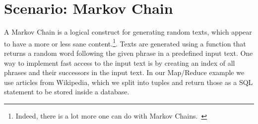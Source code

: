 \section{Scenario: Markov Chain} 

A Markov Chain is a logical construct for generating random texts, which appear to have a more or less sane content.\footnote{Indeed, there is a lot more one can do with Markov Chains.~\cite{wpMarkov}}. Texts are generated using a function that returns a random word following the given phrase in a predefined input text. One way to implement fast access to the input text is by creating an index of all phrases and their successors in the input text. In our Map/Reduce example we use articles from Wikipedia, which we split into tuples and return those as a SQL statement to be stored inside a database.
